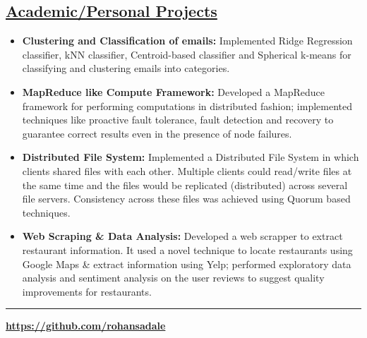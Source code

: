 \documentclass[10pt]{article}
\begin{document}
\subsection*{\underline{Academic/Personal Projects}}
\vspace{-0.05cm}
\begin{itemize}[leftmargin=0.15in]

\item {\bfseries Clustering and Classification of emails:} Implemented Ridge Regression classifier, kNN classifier, Centroid-based classifier and Spherical k-means for classifying and clustering emails into categories.

\item {\bfseries MapReduce like Compute Framework:} Developed a MapReduce framework for performing computations in distributed fashion; implemented techniques like proactive fault tolerance, fault detection and recovery to guarantee correct results even in the presence of node failures.

\item {\bfseries Distributed File System:} Implemented a Distributed File System in which clients shared files with each other. Multiple clients could read/write files at the same time and the files would be replicated (distributed) across several file servers. Consistency across these files was achieved using Quorum based techniques.

\item {\bfseries Web Scraping \& Data Analysis:} Developed a web scrapper to extract restaurant information. It used a novel technique to locate restaurants using Google Maps \& extract information using Yelp; performed exploratory data analysis and sentiment analysis on the user reviews to suggest quality improvements for restaurants.

\end{itemize}
\hrule
\noindent \begin{minipage}[b]{0.3\hsize}
\end{minipage}
\hfill
\begin{minipage}[b]{0.32 \hsize}
{\bfseries {\normalsize \url{https://github.com/rohansadale}}}
\end{minipage}
\end{document}
